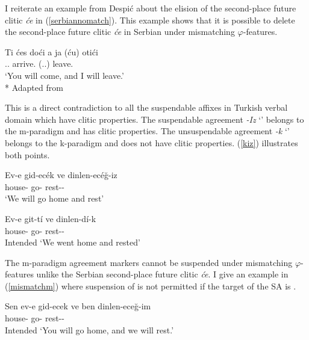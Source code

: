 I reiterate an example from Despi\'c about the elision of the second-place future clitic \textit{\'{c}e} in (\ref{serbiannomatch}). This example shows that it is possible to delete the second-place future clitic \textit{\'ce} in Serbian under mismatching $\varphi$-features. 

\begin{exe}
    \ex \label{serbiannomatch}
    \begin{xlist}
        \ex \gll Ti \'{c}es do\'{c}i a ja (\'{c}u) oti\'{c}i \\ 
        {\Ssg} {\Aux}.{\Ssg}.{\Fut} arrive.{\Inf} {\And} {\Fsg} ({\Aux}.{\Fsg}.{\Fut}) leave.{\Inf} \\
        \glt `You will come, and I will leave.'\\*
        \hfill Adapted from \cite{despic2017suspended}
    \end{xlist}
\end{exe}

This is a direct contradiction to all the suspendable affixes in Turkish verbal domain which have clitic properties. The suspendable agreement \textit{-Iz} `{\Fpl}' belongs to the m-paradigm and has clitic properties. The unsuspendable agreement \textit{-k} `{\Fpl}' belongs to the k-paradigm and does not have clitic properties. (\ref{kiz}) illustrates both points.

\begin{exe}
    \ex \label{kiz} 
    \begin{xlist}
        \ex \gll Ev-e gid-ec\'{e}k ve dinlen-ec\'{e}ğ-iz \\ 
        house-{\Dat} go-{\Fut} {\And} rest-{\Fut}-{\Fpl} \\
        \glt `We will go home and rest'
        
        \ex \gll *Ev-e git-t\'i ve dinlen-d\'i-k \\ 
        house-{\Dat} go-{\Pst} {\And} rest-{\Pst}-{\Fpl} \\
        \glt Intended `We went home and rested'
    \end{xlist}
\end{exe}

The m-paradigm agreement markers cannot be suspended under mismatching $\varphi$-features unlike the Serbian second-place future clitic \textit{\'ce}. I give an example in (\ref{mismatchm}) where suspension of {\Ssg} is not permitted if the target of the SA is {\Fsg}.

\begin{exe}
    \ex \label{mismatchm}
    \gll *Sen ev-e gid-ecek ve ben dinlen-eceğ-im \\ 
    {\Ssg} house-{\Dat} go-{\Fut} {\And} {\Fsg} rest-{\Fut}-{\Fsg} \\
    \glt Intended `You will go home, and we will rest.'
\end{exe}

